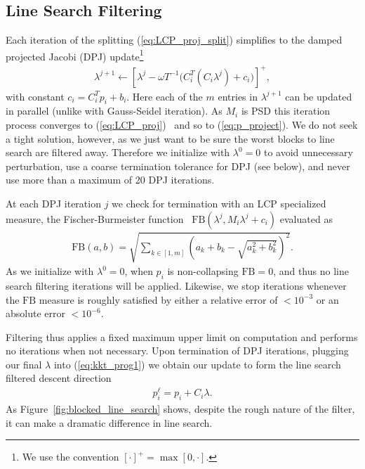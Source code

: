 \subsection{Line Search Filtering}

Each iteration of the splitting (\ref{eq:LCP_proj_split}) simplifies
to the damped projected Jacobi (DPJ) update\footnote{We use the convention $[\cdot]^+ = \max[0, \cdot]$.}
\begin{align}
\label{eq:DPJ}
\lambda^{j+1} \leftarrow \left[\lambda^j - \omega T^{-1}\big(C_i^T (C_i \lambda^j) + c_i\big)\right]^+,
\end{align}
with constant $c_i = C_i^T  p_i + b_i$. Here each of the $m$ entries in $\lambda^{j+1}$
can be updated in parallel (unlike with Gauss-Seidel iteration).
As $M_i$ is PSD this iteration process converges to
(\ref{eq:LCP_proj})~\cite{Cottle:2009} and so to (\ref{eq:p_project}).
We do not seek a tight solution, however, as we just want to be sure the worst blocks
to line search are filtered away. Therefore we initialize with $\lambda^0=0$ to avoid
unnecessary perturbation, use a coarse termination tolerance
for DPJ (see below), and never use more than a maximum of 20 DPJ iterations.

At each DPJ iteration $j$ we check for termination with an LCP
specialized measure, the Fischer-Burmeister
function~\cite{Fischer:1992:ASN}
$\mathrm{FB}(\lambda^j, M_i  \lambda^j  +  c_i)$ evaluated as
\begin{align}
\label{eq:FB}
\mathrm{FB}(a,b) = \sqrt{\sum_{k \in [1,m]}  \left(a_k + b_k - \sqrt{a_k^2 + b_k^2} \right)^2}.
\end{align} 
As we initialize with $\lambda^0 = 0$, when $p_i$ is non-collapsing
$\mathrm{FB} = 0$, and thus no line search filtering iterations
will be applied. Likewise, we stop iterations whenever the $\mathrm{FB}$
measure is roughly satisfied by either a relative error of $<10^{-3}$
or an absolute error $<10^{-6}$.

Filtering thus applies a fixed maximum upper limit on computation
and performs no iterations when not necessary. Upon termination of
DPJ iterations, plugging our final $\lambda$ into (\ref{eq:kkt_prog1})
we obtain our update to form the line search filtered descent
direction
\begin{align}
p^\ell_i = p_i  + C_i \lambda.
\end{align}
As Figure~\ref{fig:blocked_line_search} shows, despite the rough
nature of the filter, it can make a dramatic difference in line search.
